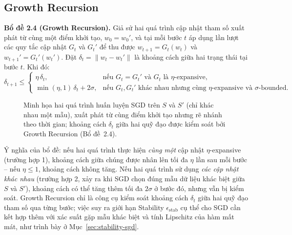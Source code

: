 \subsection{Growth Recursion}

\textbf{Bổ đề 2.4 (Growth Recursion).} Giả sử hai quá trình cập nhật tham số xuất phát từ cùng một điểm khởi tạo, $w_0 = w_0'$, và tại mỗi bước $t$ áp dụng lần lượt các quy tắc cập nhật $G_t$ và $G_t'$ để thu được $w_{t+1} = G_t(w_t)$ và $w_{t+1}' = G_t'(w_t')$. Đặt $\delta_t = \|w_t - w_t'\|$ là khoảng cách giữa hai trạng thái tại bước $t$. Khi đó:
\[
\delta_{t+1} \leq
\begin{cases}
\eta \, \delta_t, & \text{nếu } G_t = G_t' \text{ và } G_t \text{ là } \eta\text{-expansive}, \\[4pt]
\min(\eta, 1)\,\delta_t + 2\sigma, & \text{nếu } G_t, G_t' \text{ khác nhau nhưng cùng } \eta\text{-expansive và } \sigma\text{-bounded}.
\end{cases}
\]

\begin{figure}[H]
\centering
{}
\caption{Minh họa hai quá trình huấn luyện SGD trên $S$ và $S'$ (chỉ khác nhau một mẫu), xuất phát từ cùng điểm khởi tạo nhưng rẽ nhánh theo thời gian; khoảng cách $\delta_t$ giữa hai quỹ đạo được kiểm soát bởi Growth Recursion (Bổ đề~2.4).}
\label{fig:growth-recursion}
\end{figure}

Ý nghĩa của bổ đề: nếu hai quá trình thực hiện \emph{cùng một} cập nhật $\eta$-expansive (trường hợp 1), khoảng cách giữa chúng được nhân lên tối đa $\eta$ lần sau mỗi bước -- nếu $\eta \le 1$, khoảng cách không tăng. Nếu hai quá trình sử dụng \emph{các cập nhật khác nhau} (trường hợp 2, xảy ra khi SGD chọn đúng mẫu dữ liệu khác biệt giữa $S$ và $S'$), khoảng cách có thể tăng thêm tối đa $2\sigma$ ở bước đó, nhưng vẫn bị kiểm soát. Growth Recursion chỉ là công cụ kiểm soát khoảng cách $\delta_t$ giữa hai quỹ đạo tham số qua từng bước; việc suy ra giới hạn Stability $\epsilon_{\mathrm{stab}}$ cụ thể cho SGD cần kết hợp thêm với xác suất gặp mẫu khác biệt và tính Lipschitz của hàm mất mát, như trình bày ở Mục~\ref{sec:stability-sgd}.

